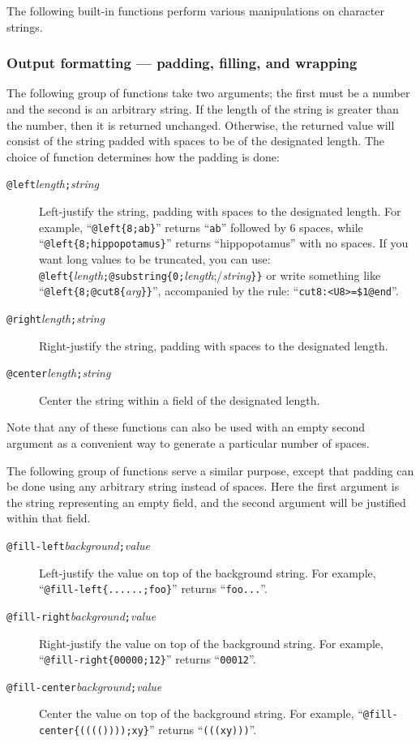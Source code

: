 The following built-in functions perform various manipulations on
character strings.

\subsubsection{Output formatting --- padding, filling, and wrapping}

The following group of functions take two arguments; the first must be a
number and the second is an arbitrary string.  If the length of the
string is greater than the number, then it is returned unchanged.
Otherwise, the returned value will consist of the string padded with
spaces to be of the designated length.  The choice of function
determines how the padding is done:
\begin{description}
\item[{\tt @left\ttlb}{\it length}{\tt ;}{\it string}{\tt \ttrb}]
Left-justify the string, padding with spaces to the designated length.
For example, ``\verb/@left{8;ab}/'' returns ``\verb/ab/'' followed by 6
spaces, while ``\verb/@left{8;hippopotamus}/'' returns ``hippopotamus''
with no spaces.  If you want long values to be truncated, you can 
use: \newline
\verb/  @left{/{\it length}\verb/;@substring{0;/{\it length};/{\it string}\verb/}}/
\newline or write
something like ``\verb/@left{8;@cut8{/{\it arg}\verb/}}/'', accompanied
by the rule:  ``\verb/cut8:<U8>=$1@end/''.
\item[{\tt @right\ttlb}{\it length}{\tt ;}{\it string}{\tt \ttrb}]
Right-justify the string, padding with spaces to the designated length.
\item[{\tt @center\ttlb}{\it length}{\tt ;}{\it string}{\tt \ttrb}]
Center the string within a field of the designated length.
\end{description}
Note that any of these functions can also be used with an empty second
argument as a convenient way to generate a particular number of spaces.


The following group of functions serve a similar purpose, except that
padding can be done using any arbitrary string instead of spaces.  Here
the first argument is the string representing an empty field, and the
second argument will be justified within that field.
\begin{description}
\item[{\tt @fill-left\ttlb}{\it background}{\tt ;}{\it value}{\tt \ttrb}]
Left-justify the value on top of the background string.
For example, ``\verb/@fill-left{......;foo}/'' returns ``\verb/foo.../''.
\item[{\tt @fill-right\ttlb}{\it background}{\tt ;}{\it value}{\tt \ttrb}]
Right-justify the value on top of the background string.
For example, ``\verb/@fill-right{00000;12}/'' returns ``\verb/00012/''.
\item[{\tt @fill-center\ttlb}{\it background}{\tt ;}{\it value}{\tt \ttrb}]
Center the value on top of the background string.
For example, ``\verb/@fill-center{(((())));xy}/'' returns ``\verb/(((xy)))/''.
\end{description}

